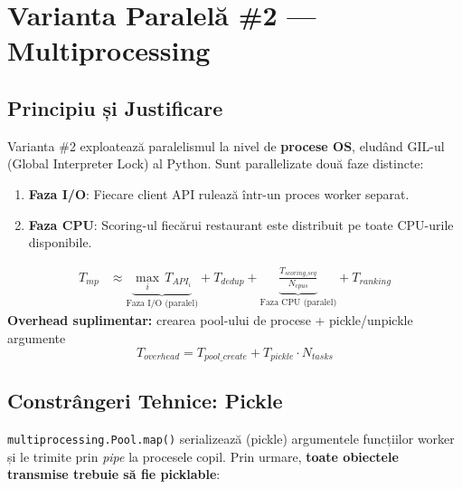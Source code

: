 \documentclass[12pt,a4paper]{article}
\begin{document}
\section{Varianta Paralelă \#2 --- Multiprocessing}

\subsection{Principiu și Justificare}

Varianta \#2 exploatează paralelismul la nivel de \textbf{procese OS}, eludând GIL-ul (Global Interpreter Lock) al Python. Sunt parallelizate două faze distincte:

\begin{enumerate}
  \item \textbf{Faza I/O}: Fiecare client API rulează într-un proces worker separat.
  \item \textbf{Faza CPU}: Scoring-ul fiecărui restaurant este distribuit pe toate CPU-urile disponibile.
\end{enumerate}

\begin{formulabox}
\begin{align*}
T_{mp} &\approx \underbrace{\max_{i}\, T_{API_i}}_{\text{Faza I/O (paralel)}}
      + T_{dedup}
      + \underbrace{\frac{T_{scoring\_seq}}{N_{cpus}}}_{\text{Faza CPU (paralel)}}
      + T_{ranking}
\end{align*}
\textbf{Overhead suplimentar:} crearea pool-ului de procese + pickle/unpickle argumente
\[
T_{overhead} = T_{pool\_create} + T_{pickle} \cdot N_{tasks}
\]
\end{formulabox}

\subsection{Constrângeri Tehnice: Pickle}

\texttt{multiprocessing.Pool.map()} serializează (pickle) argumentele funcțiilor worker și le trimite prin \emph{pipe} la procesele copil. Prin urmare, \textbf{toate obiectele transmise trebuie să fie picklable}:
\end{document}
